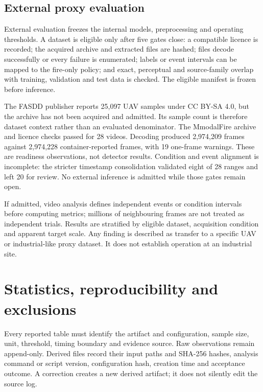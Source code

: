 \subsection{External proxy evaluation}

External evaluation freezes the internal models, preprocessing and operating
thresholds. A dataset is eligible only after five gates close: a compatible
licence is recorded; the acquired archive and extracted files are hashed; files
decode successfully or every failure is enumerated; labels or event intervals
can be mapped to the fire-only policy; and exact, perceptual and source-family
overlap with training, validation and test data is checked. The eligible
manifest is frozen before inference.

The FASDD publisher reports 25,097 UAV samples under CC BY-SA 4.0, but the
archive has not been acquired and admitted. Its sample count is therefore
dataset context rather than an evaluated denominator. The MmodalFire archive
and licence checks passed for 28 videos. Decoding produced 2,974,209 frames
against 2,974,228 container-reported frames, with 19 one-frame warnings. These
are readiness observations, not detector results. Condition and event alignment
is incomplete: the stricter timestamp consolidation validated eight of 28
ranges and left 20 for review. No external inference is admitted while those
gates remain open.

If admitted, video analysis defines independent events or condition intervals
before computing metrics; millions of neighbouring frames are not treated as
independent trials. Results are stratified by eligible dataset, acquisition
condition and apparent target scale. Any finding is described as transfer to a
specific UAV or industrial-like proxy dataset. It does not establish operation
at an industrial site.

\section{Statistics, reproducibility and exclusions}
\label{sec:methodology:8}

Every reported table must identify the artifact and configuration, sample
size, unit, threshold, timing boundary and evidence source. Raw observations
remain append-only. Derived files record their input paths and SHA-256 hashes,
analysis command or script version, configuration hash, creation time and
acceptance outcome. A correction creates a new derived artifact; it does not
silently edit the source log.

